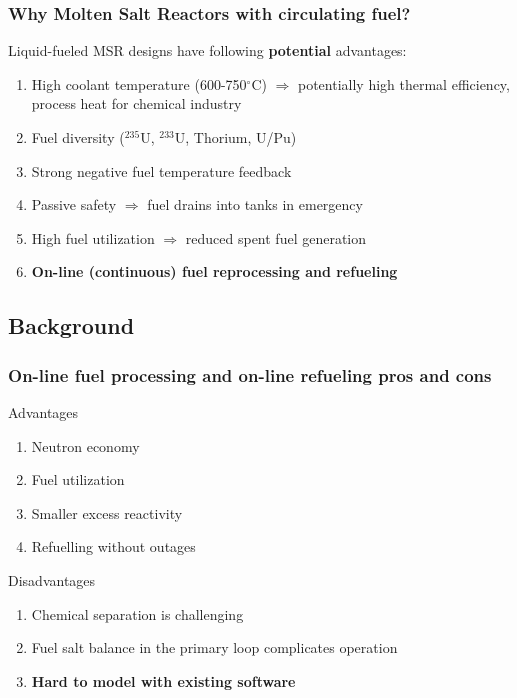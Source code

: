 \begin{frame}
\frametitle{Why Molten Salt Reactors with circulating fuel?}
\begin{block}{Liquid-fueled \gls{MSR} designs have following \textbf{potential} advantages:}
	\begin{enumerate}
		\itemsep1em
		\item High coolant temperature (600-750$^{\circ}$C) 
		$\Rightarrow$ potentially high thermal efficiency, process 
		heat for chemical industry
		\item Fuel diversity ($^{235}$U, $^{233}$U, Thorium, U/Pu)
		\item Strong negative fuel temperature feedback 
		\item Passive safety $\Rightarrow$ fuel drains into tanks 
		in emergency
		\item High fuel utilization $\Rightarrow$ reduced spent fuel 
		generation
		\item<2> \textbf{On-line (continuous) fuel reprocessing and refueling}
	\end{enumerate}
\end{block}

\end{frame}


\subsection{Background}


\begin{frame}
\frametitle{On-line fuel processing and on-line refueling pros and 
cons}
\begin{block}{Advantages}
	\begin{enumerate}
		\item Neutron economy
		\item Fuel utilization
		\item Smaller excess reactivity
		\item Refuelling without outages
	\end{enumerate}
\end{block}

\begin{block}{Disadvantages}
	\begin{enumerate}
		\item Chemical separation is challenging
		\item Fuel salt balance in the primary loop complicates operation
		\item \textbf{Hard to model with existing software}
	\end{enumerate}
\end{block}

\end{frame}


